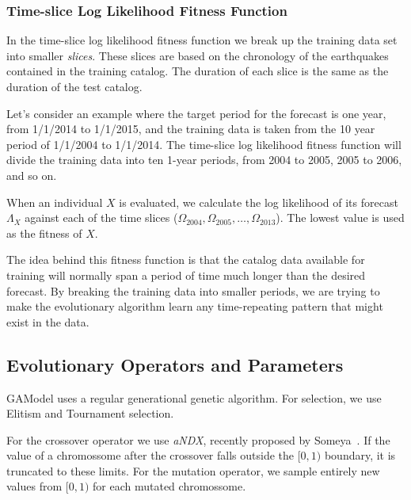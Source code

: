 \documentclass{sig-alternate}
\begin{document}
\subsubsection{Time-slice Log Likelihood Fitness Function}

In the time-slice log likelihood fitness function we break up the
training data set into smaller \emph{slices}. These slices are based
on the chronology of the earthquakes contained in the training
catalog. The duration of each slice is the same as the duration of the
test catalog.

Let's consider an example where the target period for the forecast is
one year, from 1/1/2014 to 1/1/2015, and the training data is taken
from the 10 year period of 1/1/2004 to 1/1/2014. The time-slice log
likelihood fitness function will divide the training data into ten
1-year periods, from 2004 to 2005, 2005 to 2006, and so on. 

When an individual $X$ is evaluated, we calculate the log likelihood
of its forecast $\Lambda_X$ against each of the time slices
($\Omega_{2004}, \Omega_{2005}, \dots, \Omega_{2013}$). The lowest
value is used as the fitness of $X$.

The idea behind this fitness function is that the catalog data
available for training will normally span a period of time much longer
than the desired forecast. By breaking the training data into smaller
periods, we are trying to make the evolutionary algorithm learn any
time-repeating pattern that might exist in the data.

\subsection{Evolutionary Operators and Parameters}

GAModel uses a regular generational genetic algorithm. For selection,
we use Elitism and Tournament selection. 

For the crossover operator we use \emph{aNDX}, recently proposed by
Someya~\cite{Someya2013}. If the value of a chromossome after the
crossover falls outside the $[0,1)$ boundary, it is truncated to these
  limits. For the mutation operator, we sample entirely new values
  from $[0,1)$ for each mutated chromossome.
\end{document}
